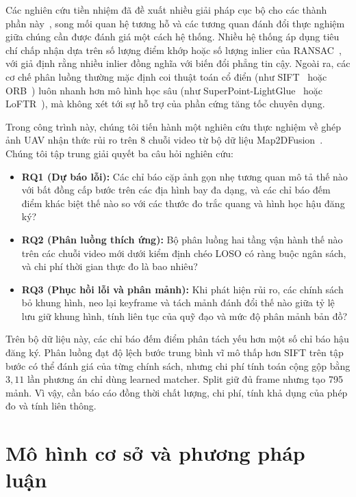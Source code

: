 \documentclass[conference]{IEEEtran}
\begin{document}
Các nghiên cứu tiền nhiệm đã đề xuất nhiều giải pháp cục bộ cho các thành phần này~\cite{hwang2026,li2023,kharismawati2025}, song mối quan hệ tương hỗ và các tương quan đánh đổi thực nghiệm giữa chúng cần được đánh giá một cách hệ thống. Nhiều hệ thống áp dụng tiêu chí chấp nhận dựa trên số lượng điểm khớp hoặc số lượng inlier của RANSAC~\cite{hwang2026}, với giả định rằng nhiều inlier đồng nghĩa với biến đổi phẳng tin cậy. Ngoài ra, các cơ chế phân luồng thường mặc định coi thuật toán cổ điển (như SIFT~\cite{lowe2004} hoặc ORB~\cite{rublee2011}) luôn nhanh hơn mô hình học sâu (như SuperPoint-LightGlue~\cite{detone2018,lindenberger2023} hoặc LoFTR~\cite{sun2021}), mà không xét tới sự hỗ trợ của phần cứng tăng tốc chuyên dụng.

Trong công trình này, chúng tôi tiến hành một nghiên cứu thực nghiệm về ghép ảnh UAV nhận thức rủi ro trên 8 chuỗi video từ bộ dữ liệu Map2DFusion~\cite{map2dfusion}. Chúng tôi tập trung giải quyết ba câu hỏi nghiên cứu:
\begin{itemize}
    \item \textbf{RQ1 (Dự báo lỗi):} Các chỉ báo cặp ảnh gọn nhẹ tương quan mô tả thế nào với bất đồng cấp bước trên các địa hình bay đa dạng, và các chỉ báo đếm điểm khác biệt thế nào so với các thước đo trắc quang và hình học hậu đăng ký?
    \item \textbf{RQ2 (Phân luồng thích ứng):} Bộ phân luồng hai tầng vận hành thế nào trên các chuỗi video mới dưới kiểm định chéo LOSO có ràng buộc ngân sách, và chi phí thời gian thực đo là bao nhiêu?
    \item \textbf{RQ3 (Phục hồi lỗi và phân mảnh):} Khi phát hiện rủi ro, các chính sách bỏ khung hình, neo lại keyframe và tách mảnh đánh đổi thế nào giữa tỷ lệ lưu giữ khung hình, tính liên tục của quỹ đạo và mức độ phân mảnh bản đồ?
\end{itemize}

Trên bộ dữ liệu này, các chỉ báo đếm điểm phân tách yếu hơn một số chỉ báo hậu đăng ký. Phân luồng đạt độ lệch bước trung bình vĩ mô thấp hơn SIFT trên tập bước có thể đánh giá của từng chính sách, nhưng chi phí tính toán cộng gộp bằng $3{,}11$ lần phương án chỉ dùng learned matcher. Split giữ đủ frame nhưng tạo 795 mảnh. Vì vậy, cần báo cáo đồng thời chất lượng, chi phí, tính khả dụng của phép đo và tính liên thông.



\section{Mô hình cơ sở và phương pháp luận}
\label{sec:methodology}
\end{document}
